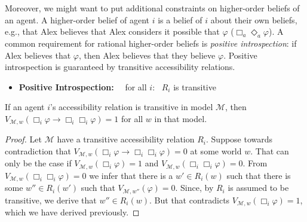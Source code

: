 \documentclass[nobib,nofonts]{tufte-handout}
\newcommand{\Model}{\ensuremath{\mathcal{M}}}
\begin{document}
Moreover, we might want to put additional constraints on higher-order beliefs of an agent.
A higher-order belief of agent $i$ is a belief of $i$ about their own beliefs, e.g., that Alex believes that Alex considers it possible that $\varphi$ ($\Box_{a}\Diamond_{a}\varphi$).
A common requirement for rational higher-order beliefs is \emph{positive introspection}: if Alex believes that $\varphi$, then Alex believes that they believe $\varphi$.
Positive introspection is guaranteed by transitive accessibility relations.
\begin{itemize}[]
  \item \textbf{Positive Introspection:} \ \  for all $i$: \ $R_{i}$ is transitive
\end{itemize}
\begin{claim}
 If an agent $i$'s accessibility relation is transitive in model $\Model$, then $V_{\Model,w}(\Box_{i}\varphi \rightarrow \Box_{i}\Box_{i}\varphi) = 1$ for all $w$ in that model.
\end{claim}
\begin{proof}
  Let $\Model$ have a transitive accessibility relation $R_{i}$.
  Suppose towards contradiction that $V_{\Model,w}(\Box_{i}\varphi \rightarrow \Box_{i}\Box_{i}\varphi) = 0$ at some world $w$.
  That can only be the case if $V_{\Model,w}(\Box_{i}\varphi) = 1$ and $V_{\Model,w}(\Box_{i}\Box_{i}\varphi) = 0$.
  From $V_{\Model,w}(\Box_{i}\Box_{i}\varphi) = 0$ we infer that there is a $w' \in R_{i}(w)$ such that there is some $w'' \in R_{i}(w')$ such that $V_{\Model, w''}(\varphi) = 0$.
  Since, by $R_{i}$ is assumed to be transitive, we derive that $w'' \in R_{i}(w)$.
  But that contradicts $V_{\Model,w}(\Box_{i}\varphi) = 1$, which we have derived previously.
\end{proof}
\end{document}
